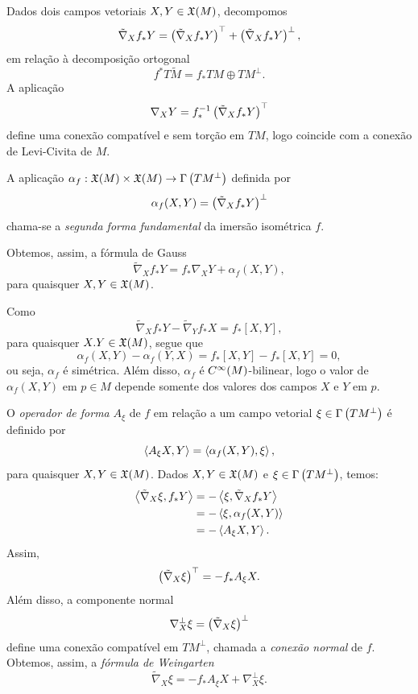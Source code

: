 Dados dois campos vetoriais $X,Y \in \mathfrak{X}(M)$, decompomos
\[ \tilde{\nabla}_X f_* Y = \left( \tilde{\nabla}_X f_* Y \right)^\top + \left( \tilde{\nabla}_X f_* Y \right)^\perp, \]
em relação à decomposição ortogonal
\[ f^* T \tilde{M} = f_* TM \oplus TM^\perp. \]
A aplicação
\[ \nabla_X Y = f_*^{-1} \left( \tilde{\nabla}_X f_* Y \right)^\top \]
define uma conexão compatível e sem torção em $TM$, logo coincide com a conexão de Levi-Civita de $M$.

\begin{definicao}
	A aplicação $\alpha_f: \mathfrak{X}(M) \times \mathfrak{X}(M) \rightarrow \Gamma \left( TM^\perp \right)$ definida por
	\[ \alpha_f (X,Y) = \left( \tilde{\nabla}_X f_* Y \right)^\perp \]
	chama-se a \emph{segunda forma fundamental} da imersão isométrica $f$.
\end{definicao}

Obtemos, assim, a fórmula de Gauss
\[ \tilde{\nabla}_X f_* Y = f_* \nabla_X Y + \alpha_f (X,Y), \]
para quaisquer $X, Y \in \mathfrak{X}(M)$.

\begin{observacao}
	Como
	\[ \tilde{\nabla}_X f_* Y - \tilde{\nabla}_Y f_* X = f_* [X,Y], \]
	para quaisquer $X.Y \in \mathfrak{X}(M)$, segue que
	\[ \alpha_f (X,Y) - \alpha_f(Y,X) = f_* [X,Y] - f_* [X,Y] = 0, \]
	ou seja, $\alpha_f$ é simétrica. Além disso, $\alpha_f$ é $C^\infty(M)$-bilinear, logo o valor de $\alpha_f (X,Y)$ em $p \in M$ depende somente dos valores dos campos $X$ e $Y$ em $p$.
\end{observacao}

O \emph{operador de forma} $A_\xi$ de $f$ em relação a um campo vetorial $\xi \in \Gamma \left( TM^\perp \right)$ é definido por
\[ \left\langle A_\xi X,Y \right\rangle = \left\langle \alpha_f (X,Y),\xi \right\rangle, \]
para quaisquer $X,Y \in \mathfrak{X}(M)$. Dados $X,Y \in \mathfrak{X}(M)$ e $\xi \in \Gamma \left( TM^\perp \right)$, temos:
\begin{align*}
	\left\langle \tilde{\nabla}_X \xi,f_* Y \right\rangle &= - \left\langle \xi,\tilde{\nabla}_X f_* Y \right\rangle\\
	&= -\left\langle \xi,\alpha_f (X,Y) \right\rangle\\
	&= -\left\langle A_\xi X,Y \right\rangle.
\end{align*}
Assim,
\[ \left( \tilde{\nabla}_X \xi \right)^\top  = -f_* A_\xi X. \]
Além disso, a componente normal
\[ \nabla^\perp_X \xi = \left( \tilde{\nabla}_X \xi \right)^\perp \]
define uma conexão compatível em $TM^\perp$, chamada a \emph{conexão normal} de $f$. Obtemos, assim, a \emph{fórmula de Weingarten}
\[ \tilde{\nabla}_X \xi = - f_* A_\xi X + \nabla^\perp_X \xi. \]

